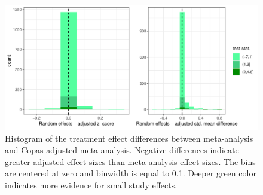 \documentclass[11pt,a4paper,twoside]{book}\usepackage[]{graphicx}\usepackage[]{color}
\newenvironment{knitrout}{}{} %
\begin{document}
\begin{figure}
\begin{knitrout}
\color{fgcolor}

{\centering \includegraphics[width=\textwidth-3cm]{figure/ch03_figunnamed-chunk-22-1} 

}



\end{knitrout}
\caption{Histogram of the treatment effect differences between meta-analysis and Copas adjusted meta-analysis. Negative differences indicate greater adjusted effect sizes than meta-analysis effect sizes. The bins are centered at zero and binwidth is equal to 0.1. Deeper green color indicates more evidence for small study effects.}
\label{fig:adjustment.copas}
\end{figure}
\end{document}
